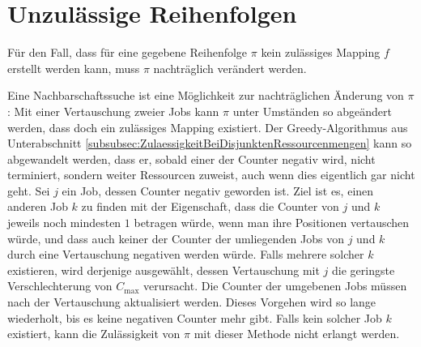 \documentclass{scrreprt}
\begin{document}
\section{Unzulässige Reihenfolgen}
\label{UnzulaessigeReihenfolgen}
Für den Fall, dass für eine gegebene Reihenfolge $\pi$ kein zulässiges Mapping $f$ erstellt werden kann, muss $\pi$ nachträglich verändert werden.

Eine Nachbarschaftssuche ist eine Möglichkeit zur nachträglichen Änderung von $\pi$:
Mit einer Vertauschung zweier Jobs kann $\pi$ unter Umständen so abgeändert werden, dass doch ein zulässiges Mapping existiert.
Der Greedy-Algorithmus aus Unterabschnitt \ref{subsubsec:ZulaessigkeitBeiDisjunktenRessourcenmengen} kann so abgewandelt werden,
dass er, sobald einer der Counter negativ wird, nicht terminiert, sondern weiter Ressourcen zuweist, auch wenn dies eigentlich gar nicht geht.
Sei $j$ ein Job, dessen Counter negativ geworden ist.
Ziel ist es, einen anderen Job $k$ zu finden mit der Eigenschaft, dass die Counter von $j$ und $k$ jeweils noch mindesten $1$ betragen würde, 
wenn man ihre Positionen vertauschen würde,
und dass auch keiner der Counter der umliegenden Jobs von $j$ und $k$ durch eine Vertauschung negativen werden würde.
Falls mehrere solcher $k$ existieren, wird derjenige ausgewählt, dessen Vertauschung mit $j$ die geringste Verschlechterung von $C_{\max}$ verursacht.
Die Counter der umgebenen Jobs müssen nach der Vertauschung aktualisiert werden.
Dieses Vorgehen wird so lange wiederholt, bis es keine negativen Counter mehr gibt.
Falls kein solcher Job $k$ existiert, kann die Zulässigkeit von $\pi$ mit dieser Methode nicht erlangt werden.


\end{document}
